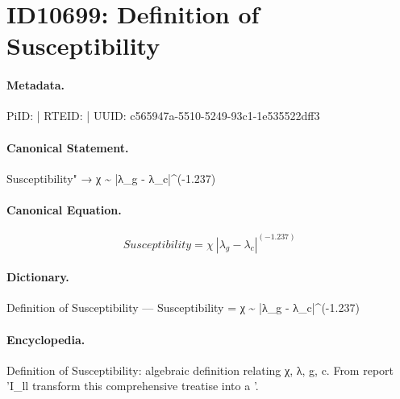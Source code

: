 \section*{ID10699: Definition of Susceptibility}
\paragraph{Metadata.}
PiID:  | RTEID:  | UUID: c565947a-5510-5249-93c1-1e535522dff3

\paragraph{Canonical Statement.}
Susceptibility" → χ \textasciitilde{} |λ\_g - λ\_c|\textasciicircum{}(-1.237)

\paragraph{Canonical Equation.}
\[
Susceptibility = χ ~ |λ_g - λ_c|^(-1.237)
\]

\paragraph{Dictionary.}
Definition of Susceptibility — Susceptibility = χ \textasciitilde{} |λ\_g - λ\_c|\textasciicircum{}(-1.237)

\paragraph{Encyclopedia.}
Definition of Susceptibility: algebraic definition relating χ, λ, g, c. From report 'I\_ll transform this comprehensive treatise into a '.
